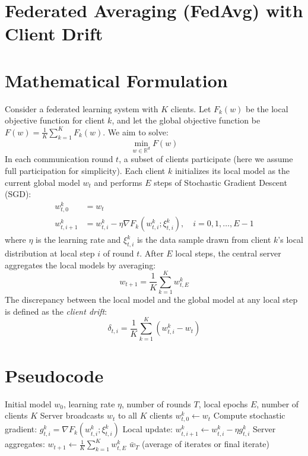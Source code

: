 \documentclass{article}
\begin{document}
\section*{Federated Averaging (FedAvg) with Client Drift}

\section*{Mathematical Formulation}
Consider a federated learning system with $K$ clients. Let $F_k(w)$ be the local objective function for client $k$, and let the global objective function be $F(w) = \frac{1}{K} \sum_{k=1}^K F_k(w)$. We aim to solve:
$$ \min_{w \in \mathbb{R}^d} F(w) $$
In each communication round $t$, a subset of clients participate (here we assume full participation for simplicity). Each client $k$ initializes its local model as the current global model $w_t$ and performs $E$ steps of Stochastic Gradient Descent (SGD):
\begin{align}
    w_{t,0}^k &= w_t \\
    w_{t,i+1}^k &= w_{t,i}^k - \eta \nabla F_k(w_{t,i}^k; \xi_{t,i}^k), \quad i = 0, 1, \dots, E-1
\end{align}
where $\eta$ is the learning rate and $\xi_{t,i}^k$ is the data sample drawn from client $k$'s local distribution at local step $i$ of round $t$. 
After $E$ local steps, the central server aggregates the local models by averaging:
$$ w_{t+1} = \frac{1}{K} \sum_{k=1}^K w_{t,E}^k $$
The discrepancy between the local model and the global model at any local step is defined as the \textit{client drift}:
$$ \delta_{t,i} = \frac{1}{K} \sum_{k=1}^K (w_{t,i}^k - w_t) $$

\section*{Pseudocode}
\begin{algorithm}[H]
\caption{Federated Averaging (FedAvg)}
\begin{algorithmic}[1]
\Require Initial model $w_0$, learning rate $\eta$, number of rounds $T$, local epochs $E$, number of clients $K$
    \State Server broadcasts $w_t$ to all $K$ clients
        \State $w_{t,0}^k \gets w_t$
            \State Compute stochastic gradient: $g_{t,i}^k = \nabla F_k(w_{t,i}^k; \xi_{t,i}^k)$
            \State Local update: $w_{t,i+1}^k \gets w_{t,i}^k - \eta g_{t,i}^k$
        \EndFor
    \EndFor
    \State Server aggregates: $w_{t+1} \gets \frac{1}{K} \sum_{k=1}^K w_{t,E}^k$
\EndFor
\Ensure $\bar{w}_T$ (average of iterates or final iterate)
\end{algorithmic}
\end{algorithm}
\end{document}
